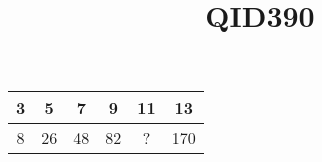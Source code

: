 \documentclass[10pt,a4paper]{article}
\title {QID390}
\begin{document}
\maketitle

\begin{tabular}{|c|c|c|c|c|c|}
\hline
3 & 5 & 7 & 9 & 11 & 13 \\
\hline
8 & 26 & 48 & 82 & ? & 170 \\
\hline
\end{tabular}
\end{document}
